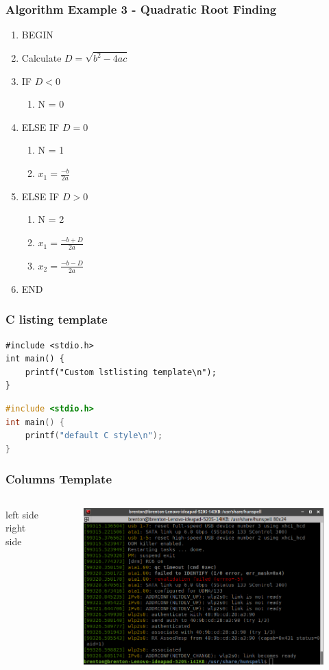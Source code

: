 \documentclass[14pt]{beamer}
\begin{document}
\begin{frame}
\frametitle{Algorithm Example 3 - Quadratic Root Finding}
{\footnotesize
\begin{enumerate}
\setlength{\itemsep}{0pt}
  \setlength{\parskip}{0pt}
  \setlength{\parsep}{0pt}
\item BEGIN
\item Calculate $D = \sqrt{b^2 - 4 a c}$
\item IF $D < 0$
	\begin{enumerate}
		\item N = 0
	\end{enumerate}
\item ELSE IF $D = 0$
	\begin{enumerate}
		\item N = 1
		\item $x_1 = \frac{-b}{2a}$
	\end{enumerate}
\item ELSE IF $D > 0$
	\begin{enumerate}
		\item N = 2
		\item $x_1 = \frac{-b + D}{2a}$
		\item $x_2 = \frac{-b - D}{2a}$
	\end{enumerate}
\item END
\end{enumerate}

}
\end{frame}

\begin{frame}[fragile] %
\frametitle{C listing template}
\begin{lstlisting}[style=CStyle]
#include <stdio.h>
int main() {
	printf("Custom lstlisting template\n");
}
\end{lstlisting}

\begin{lstlisting}[language=c]
#include <stdio.h>
int main() {
	printf("default C style\n");
}
\end{lstlisting}
\end{frame}

\begin{frame}
\frametitle{Columns Template}
\begin{columns}
\column{1.5in}
left side
\column{1.5in}
right side
\begin{figure}
\includegraphics[scale=0.2]{test}
\end{figure}
\end{columns}
\end{frame}
\end{document}
